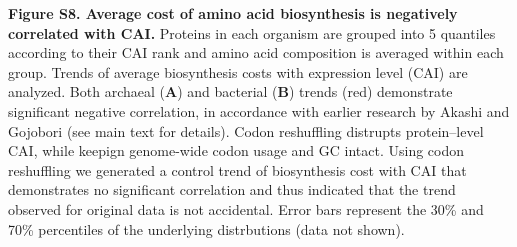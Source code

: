 \documentclass{report}
\begin{document}
{\bf Figure S8. Average cost of amino acid biosynthesis is negatively correlated with CAI.} Proteins in each organism are grouped into 5 quantiles according to their CAI rank and amino acid composition is averaged within each group. Trends of average biosynthesis costs  with expression level (CAI) are analyzed. Both archaeal ({\bf A}) and bacterial ({\bf B}) trends (red) demonstrate significant negative correlation, in accordance with earlier research by Akashi and Gojobori (see main text for details). Codon reshuffling distrupts protein--level CAI, while keepign genome-wide codon usage and GC intact. Using codon reshuffling we generated a control trend of biosynthesis cost with CAI that demonstrates no significant correlation and thus indicated that the trend observed for original data is not accidental. Error bars represent the 30\% and 70\% percentiles of the underlying distrbutions (data not shown).





\end{document}
